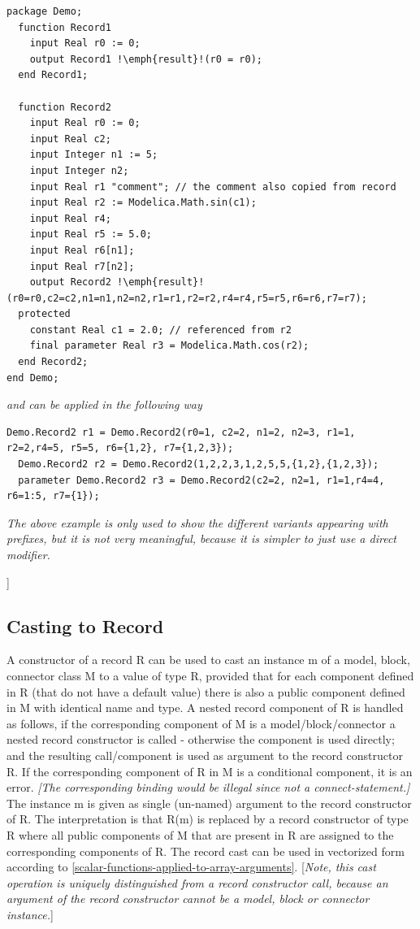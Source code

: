 \documentclass[10pt,a4paper]{report}
\def\doublelabel#1{\label{#1}}
\begin{document}
\begin{lstlisting}[language=modelica,escapechar=!]
package Demo;
  function Record1
    input Real r0 := 0;
    output Record1 !\emph{result}!(r0 = r0);
  end Record1;

  function Record2
    input Real r0 := 0;
    input Real c2;
    input Integer n1 := 5;
    input Integer n2;
    input Real r1 "comment"; // the comment also copied from record
    input Real r2 := Modelica.Math.sin(c1);
    input Real r4;
    input Real r5 := 5.0;
    input Real r6[n1];
    input Real r7[n2];
    output Record2 !\emph{result}!(r0=r0,c2=c2,n1=n1,n2=n2,r1=r1,r2=r2,r4=r4,r5=r5,r6=r6,r7=r7);
  protected
    constant Real c1 = 2.0; // referenced from r2
    final parameter Real r3 = Modelica.Math.cos(r2);
  end Record2;
end Demo;
\end{lstlisting}
\emph{and can be applied in the following way}
\begin{lstlisting}[language=modelica]
  Demo.Record2 r1 = Demo.Record2(r0=1, c2=2, n1=2, n2=3, r1=1, r2=2,r4=5, r5=5, r6={1,2}, r7={1,2,3});
  Demo.Record2 r2 = Demo.Record2(1,2,2,3,1,2,5,5,{1,2},{1,2,3});
  parameter Demo.Record2 r3 = Demo.Record2(c2=2, n2=1, r1=1,r4=4, r6=1:5, r7={1});
\end{lstlisting}

\emph{The above example is only used to show the different variants
appearing with prefixes, but it is not very meaningful, because it is
simpler to just use a direct modifier.}

{]}

\subsection{Casting to Record}\doublelabel{casting-to-record}

A constructor of a record R can be used to cast an instance m of a
model, block, connector class M to a value of type R, provided that for
each component defined in R (that do not have a default value) there is
also a public component defined in M with identical name and type. A
nested record component of R is handled as follows, if the corresponding
component of M is a model/block/connector a nested record constructor is
called - otherwise the component is used directly; and the resulting
call/component is used as argument to the record constructor R. If the
corresponding component of R in M is a conditional component, it is an
error. \emph{{[}The corresponding binding would be illegal since not a
connect-statement.{]}} The instance m is given as single (un-named)
argument to the record constructor of R. The interpretation is that R(m)
is replaced by a record constructor of type R where all public
components of M that are present in R are assigned to the corresponding
components of R. The record cast can be used in vectorized form
according to \ref{scalar-functions-applied-to-array-arguments}. {[}\emph{Note, this cast operation is
uniquely distinguished from a record constructor call, because an
argument of the record constructor cannot be a model, block or connector
instance.}{]}
\end{document}
